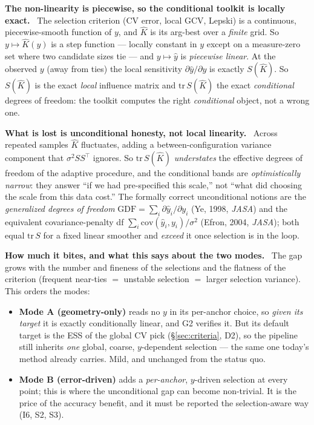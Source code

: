 \documentclass[11pt]{article}
\newcommand{\field}[1]{\smallskip\noindent\textbf{\textsf{#1.}}\ }
\begin{document}
\field{The non-linearity is piecewise, so the conditional toolkit is locally exact}
The selection criterion (CV error, local GCV, Lepski) is a continuous, piecewise-smooth
function of $y$, and $\hat K$ is its arg-best over a \emph{finite} grid. So
$y\mapsto\hat K(y)$ is a step function --- locally constant in $y$ except on a
measure-zero set where two candidate sizes tie --- and $y\mapsto\hat y$ is
\emph{piecewise linear}. At the observed $y$ (away from ties) the local sensitivity
$\partial\hat y/\partial y$ is exactly $S(\hat K)$. So $S(\hat K)$ is the exact
\emph{local} influence matrix and $\mathrm{tr}\,S(\hat K)$ the exact \emph{conditional}
degrees of freedom: the toolkit computes the right \emph{conditional} object, not a
wrong one.

\field{What is lost is unconditional honesty, not local linearity}
Across repeated samples $\hat K$ fluctuates, adding a between-configuration variance
component that $\sigma^2 SS^\top$ ignores. So $\mathrm{tr}\,S(\hat K)$ \emph{understates}
the effective degrees of freedom of the adaptive procedure, and the conditional bands
are \emph{optimistically narrow}: they answer ``if we had pre-specified this scale,''
not ``what did choosing the scale from this data cost.'' The formally correct
unconditional notions are the \emph{generalized degrees of freedom}
$\mathrm{GDF}=\sum_i \partial\hat y_i/\partial y_i$ (Ye, 1998, \emph{JASA}) and the
equivalent covariance-penalty df $\sum_i \mathrm{cov}(\hat y_i,y_i)/\sigma^2$ (Efron,
2004, \emph{JASA}); both equal $\mathrm{tr}\,S$ for a fixed linear smoother and
\emph{exceed} it once selection is in the loop.

\field{How much it bites, and what this says about the two modes}
The gap grows with the number and fineness of the selections and the flatness of the
criterion (frequent near-ties $=$ unstable selection $=$ larger selection variance).
This orders the modes:
\begin{itemize}[leftmargin=1.4em]
\item \textbf{Mode A (geometry-only)} reads no $y$ in its per-anchor choice, so
\emph{given its target} it is exactly conditionally linear, and G2 verifies it. But its
default target is the ESS of the global CV pick (\S\ref{sec:criteria}, D2), so the
pipeline still inherits \emph{one} global, coarse, $y$-dependent selection --- the same
one today's method already carries. Mild, and unchanged from the status quo.
\item \textbf{Mode B (error-driven)} adds a \emph{per-anchor}, $y$-driven selection at
every point; this is where the unconditional gap can become non-trivial. It is the
price of the accuracy benefit, and it must be reported the selection-aware way (I6, S2,
S3).
\end{itemize}
\end{document}
